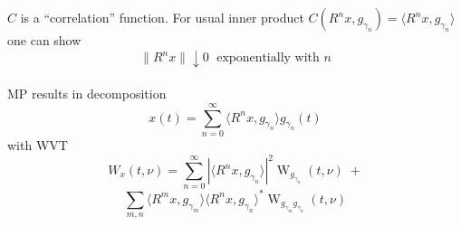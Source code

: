 \documentclass{slides}
\def\W{\operatorname{W}}
\def\WV{Wigner-Ville}
\begin{document}
\begin{slide}
$C$ is a ``correlation'' function.  For usual inner product
$C(R^nx,g_{\gamma_n}) = \langle R^nx,g_{\gamma_n}\rangle$
one can show 
\[
\|R^nx\| \downarrow 0\;\text{ exponentially with } n
\]\\
MP results in decomposition
\[
x(t) = \sum_{n=0}^\infty \langle R^nx,g_{\gamma_n} \rangle g_{\gamma_n}(t) 
\]
with WVT %
\begin{equation*}
W_x(t,\nu) = \sum_{n=0}^\infty 
    \left|\langle R^nx,g_{\gamma_n} \rangle \right|^2 
\W_{g_{\gamma_n}}(t,\nu)\;+
\end{equation*}
\begin{equation*}
\sum_{m,n}
\langle R^mx,g_{\gamma_m}\rangle \langle R^nx,g_{\gamma_n}\rangle^*
\W_{g_{\gamma_m}g_{\gamma_n}}(t,\nu)
\end{equation*}
\end{slide}
\end{document}
